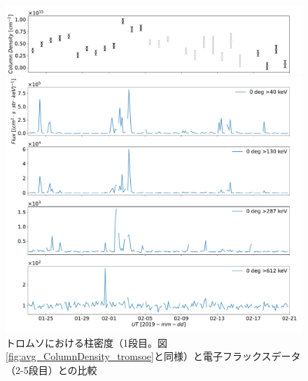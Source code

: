 \begin{figure}[htbp]
    \centering
    \begin{minipage}{\linewidth}
        \centering
        \includegraphics[width=\linewidth]{master_thesis_contents/master_thesis_fig/avg_ColumnDensity_tromsoe_trim.pdf}
    \end{minipage}
    \begin{minipage}{\linewidth}
        \centering
        \includegraphics[width=\linewidth]{master_thesis_contents/master_thesis_fig/poes_tromsoe_0deg.pdf}
    \end{minipage}
    \caption{トロムソにおける柱密度（1段目。図\ref{fig:avg_ColumnDensity_tromsoe}と同様）と電子フラックスデータ（2-5段目）との比較}
    \label{fig:poes_mmcd_tromsoe}
\end{figure}
